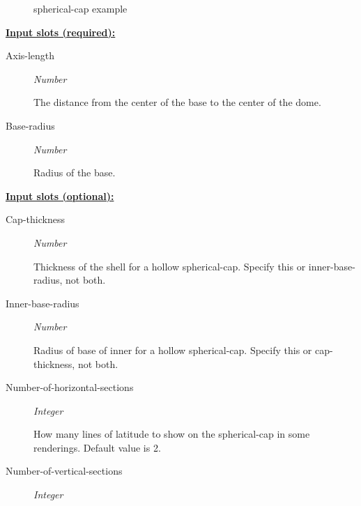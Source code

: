 \documentclass [11pt]{book}
\begin{document}
\begin{itemize}
\begin{figure}
\caption{spherical-cap example}

\label{fig:spherical-cap}

\end{figure}





\textbf{
\underline{Input slots (required):}}

\begin{description}

\item [Axis-length]
\emph{Number}

 The distance from the center of the base to the center of the dome.




\item [Base-radius]
\emph{Number}

 Radius of the base.




\end{description}






\textbf{
\underline{Input slots (optional):}}

\begin{description}

\item [Cap-thickness]
\emph{Number}

 Thickness of the shell for a hollow spherical-cap. Specify this
or inner-base-radius, not both.




\item [Inner-base-radius]
\emph{Number}

 Radius of base of inner for a hollow spherical-cap. Specify this
or cap-thickness, not both.




\item [Number-of-horizontal-sections]
\emph{Integer}

 How many lines of latitude to show on the spherical-cap in some renderings. Default value is 2.




\item [Number-of-vertical-sections]
\emph{Integer}


\end{description}
\end{itemize}
\end{document}
